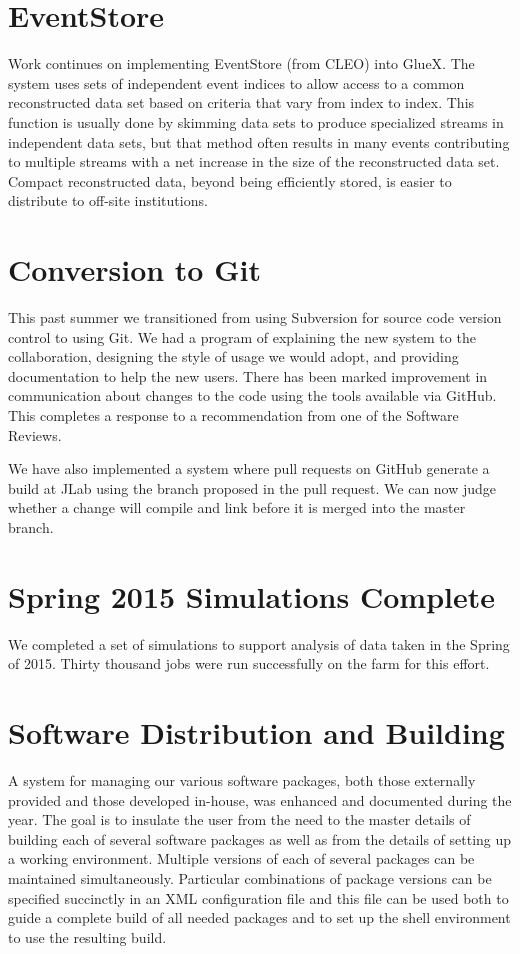 \documentclass[12pt]{article}
\begin{document}
\section{EventStore}

Work continues on implementing EventStore (from CLEO) into GlueX.
The system uses sets of independent event indices to
allow access to a common reconstructed data set based on criteria that
vary from index to index. This function is usually done by skimming
data sets to produce specialized streams in independent data sets, but
that method often results in many events contributing to multiple
streams with a net increase in the size of the reconstructed data
set. Compact reconstructed data, beyond being efficiently stored, is
easier to distribute to off-site institutions.

\section{Conversion to Git}

This past summer we transitioned from using Subversion for source code
version control to using Git. We had a program of explaining the new
system to the collaboration, designing the style of usage we would
adopt, and providing documentation to help the new users. There has
been marked improvement in communication about changes to the code
using the tools available via GitHub\cite{gluex-github}.
This completes a response to a
recommendation from one of the Software Reviews.

We have also implemented a system where pull requests on GitHub generate a build
at JLab using the branch proposed in the pull request. We can now
judge whether a change will compile and link before it is merged into
the master branch.

\section{Spring 2015 Simulations Complete}

We completed a set of simulations to support analysis of data taken in
the Spring of 2015. Thirty thousand jobs were run successfully on the
farm for this effort.

\section{Software Distribution and Building}

A system for managing our various software packages,
both those externally provided
and those developed in-house, was enhanced and documented during the
year. The goal is to insulate the user from the need to the master
details of building each of several software packages as well as from
the details of setting up a working environment. Multiple versions of
each of several packages can be maintained simultaneously. Particular
combinations of package versions can be specified succinctly in an XML
configuration file and this file can be used both to guide a complete
build of all needed packages and to set up the shell environment to
use the resulting build.
\end{document}
